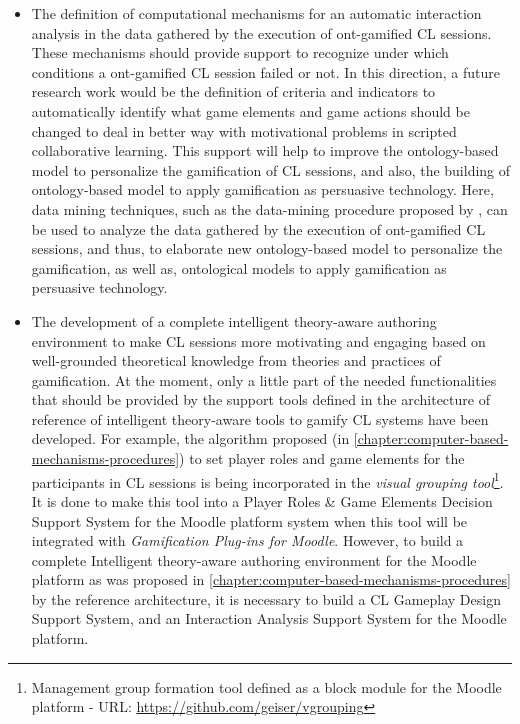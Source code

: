 \begin{itemize}
\item The definition of computational mechanisms for an automatic interaction analysis in the data gathered by the execution of ont-gamified CL sessions.
These mechanisms should provide support to recognize under which conditions a ont-gamified CL session failed or not.
In this direction, a future research work would be the definition of criteria and indicators to automatically identify what game elements and game actions should be changed to deal in better way with motivational problems in scripted collaborative learning.
This support will help to improve the ontology-based model to personalize the gamification of CL sessions, and also, the  building of ontology-based model to apply gamification as persuasive technology.
Here, data mining techniques, such as the data-mining procedure proposed by , can be used to analyze the data gathered by the execution of ont-gamified CL sessions, and thus, to elaborate new ontology-based model to personalize the gamification, as well as, ontological models to apply gamification as persuasive technology.


\item The development of a complete intelligent theory-aware authoring environment to make CL sessions more motivating and engaging based on well-grounded theoretical knowledge from theories and practices of gamification.
At the moment, only a little part of the needed functionalities that should be provided by the support tools defined in the architecture of reference of intelligent theory-aware tools to gamify CL systems have been developed.
For example, the algorithm proposed (in \autoref{chapter:computer-based-mechanisms-procedures}) to set player roles and game elements for the participants in CL sessions is being incorporated in the \emph{visual grouping tool}\footnote{Management group formation tool defined as a block module for the Moodle platform - URL: \url{https://github.com/geiser/vgrouping}}.
It is done to make this tool into a Player Roles \& Game Elements Decision Support System for the Moodle platform system when this tool will be integrated with \emph{Gamification Plug-ins for Moodle}.
However, to build a complete Intelligent theory-aware authoring environment for the Moodle platform as was proposed in \autoref{chapter:computer-based-mechanisms-procedures} by the reference architecture, it is necessary to build a CL Gameplay Design Support System, and an Interaction Analysis Support System for the Moodle platform.
\end{itemize}

